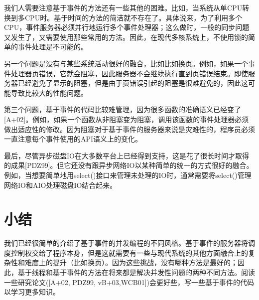 我们人需要注意基于事件的方法还有一些其他的困难。比如，当系统从单CPU转换到多CPU时。基于时间的方法的简洁就不存在了。具体说来，为了利用多个CPU，事件服务器必须并行地运行多个事件处理器；这么做时，一般的同步问题又发生了，又需要使用那些常用的方法。因此，在现代多核系统上，不使用锁的简单的事件处理是不可能的。

另一个问题是没有与某些系统活动很好的融合，比如比如换页。例如，如果一个事件处理器页错误，它就会阻塞，因此服务器不会继续执行直到页错误结束。即使服务器已经避免了显示的阻塞，但是由于页错误引起的阻塞是很难避免的，因此这可能导致比较大的性能问题。

第三个问题，基于事件的代码比较难管理，因为很多函数的准确语义已经变了[A+02]。例如，如果一个函数从非阻塞变为阻塞，调用该函数的事件处理器必须做出适应性的修改。因为阻塞对于基于事件的服务器来说是灾难性的，程序员必须一直注意每个事件使用的API语义上的变化。

最后，尽管异步磁盘IO在大多数平台上已经得到支持，这是花了很长时间才取得的成果[PDZ99]。但它还没有跟异步网络IO以某种简单的统一的方式很好的融合。例如，当想要简单地用select()接口来管理未处理的IO时，通常需要将select()管理网络IO和AIO处理磁盘IO结合起来。

\section{小结}

我们已经很简单的介绍了基于事件的并发编程的不同风格。基于事件的服务器将调度控制权交给了程序本身，但是这就需要有一些与现代系统的其他方面融合上的复杂性和难度上的提升（比如换页）。因为这些挑战，没有哪种方法是最好的；因此，基于线程和基于事件的方法在将来都是解决并发性问题的两种不同方法。阅读一些研究论文([A+02, PDZ99, vB+03,WCB01])会更好些，写一些基于事件的代码以学习更多知识。


















